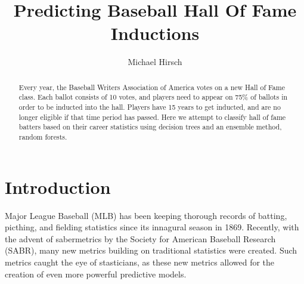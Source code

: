 \documentclass[preprint,12pt]{elsarticle}
\begin{document}
\begin{frontmatter}


\title{Predicting Baseball Hall Of Fame Inductions}




\author{Michael Hirsch}
\address{ILLC, University of Amsterdam}
\address{michaelahirsch@gmail.com}

\begin{abstract}
Every year, the Baseball Writers Association of America votes on a new Hall of Fame class. Each ballot consists of 10 votes, and players need to appear on 75\% of ballots in order to be inducted into the hall. Players have 15 years to get inducted, and are no longer eligible if that time period has passed. Here we attempt to classify hall of fame batters based on their career statistics using decision trees and an ensemble method, random forests.
\end{abstract}


\end{frontmatter}

\section{Introduction}
\label{S:1}
Major League Baseball (MLB) has been keeping thorough records of batting, picthing, and fielding statistics since its innagural season in 1869. Recently, with the advent of sabermetrics by the Society for American Baseball Research (SABR), many  new metrics building on traditional statistics were created. Such metrics caught the eye of stasticians, as these new metrics allowed for the creation of even more powerful predictive models. 
\end{document}
